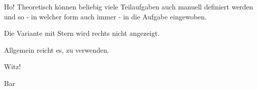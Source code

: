 \documentclass{sp-exam}
\date{12. März 2024}
\begin{document}
   \maketitle

   
   

   \begin{Exercise}{Ho!}
      Theoretisch können beliebig viele Teilaufgaben auch manuell definiert werden und so - in welcher form auch immer - in die Aufgabe eingewoben.

      Die Variante mit Stern wird rechts nicht angezeigt.

      Allgemein reicht es, \string\Subtask\space zu verwenden.
   \end{Exercise}

   \begin{Exercise}[1]{Witz!}
   \end{Exercise}

   \appendix

   Bar
\end{document}
